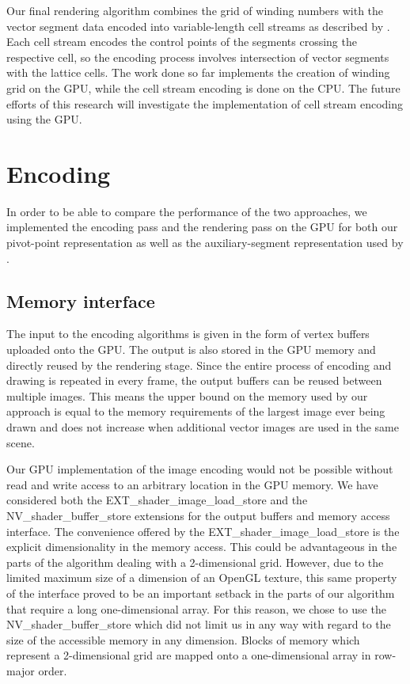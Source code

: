 \documentclass[11pt,a4paper,twoside]{article}
\begin{document}
Our final rendering algorithm combines the grid of winding numbers with the vector segment data encoded into variable-length cell streams as described by \cite{NehabHoppe08}. Each cell stream encodes the control points of the segments crossing the respective cell, so the encoding process involves intersection of vector segments with the lattice cells. The work done so far implements the creation of winding grid on the GPU, while the cell stream encoding is done on the CPU. The future efforts of this research will investigate the implementation of cell stream encoding using the GPU.

\section{Encoding}

In order to be able to compare the performance of the two approaches, we implemented the encoding pass and the rendering pass on the GPU for both our pivot-point representation as well as the auxiliary-segment representation used by \cite{NehabHoppe08}.

\subsection{Memory interface}

The input to the encoding algorithms is given in the form of vertex buffers uploaded onto the GPU. The output is also stored in the GPU memory and directly reused by the rendering stage. Since the entire process of encoding and drawing is repeated in every frame, the output buffers can be reused between multiple images. This means the upper bound on the memory used by our approach is equal to the memory requirements of the largest image ever being drawn and does not increase when additional vector images are used in the same scene.

Our GPU implementation of the image encoding would not be possible without read and write access to an arbitrary location in the GPU memory. We have considered both the EXT\_shader\_image\_load\_store and the NV\_shader\_buffer\_store extensions for the output buffers and memory access interface. The convenience offered by the EXT\_shader\_image\_load\_store is the explicit dimensionality in the memory access. This could be advantageous in the parts of the algorithm dealing with a 2-dimensional grid. However, due to the limited maximum size of a dimension of an OpenGL texture, this same property of the interface proved to be an important setback in the parts of our algorithm that require a long one-dimensional array. For this reason, we chose to use the NV\_shader\_buffer\_store which did not limit us in any way with regard to the size of the accessible memory in any dimension. Blocks of memory which represent a 2-dimensional grid are mapped onto a one-dimensional array in row-major order.
\end{document}
